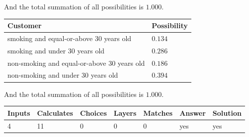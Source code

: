 \documentclass[12pt]{article}
\begin{document}
\noindent
And the total summation of all possibilities is $  %
1.000 $.
 
 
 
 
\noindent{}
 
 

 
 
 
\noindent{}
 
 

 
\noindent
\begin{tabular}{|l|l|}
\hline
Customer & Possibility \\
\hline
smoking  and  %
equal-or-above 30 years old &
  $ %
0.134$ \\
\hline
smoking  and  %
under 30 years old &
  $ %
0.286$ \\
\hline
 non-smoking and  %
equal-or-above 30 years old &
  $ %
0.186$ \\
\hline
 non-smoking and  %
under 30 years old &
  $ %
0.394$ \\
\hline
\end{tabular}
 
\noindent
 And the total summation of all possibilities is $  %
1.000 $.
 
 
 
\noindent{}
 
 

 
\vspace{0.3in}
   
   
   
   
\noindent\begin{tabular}{|l|l|l|l|l|l|l|}
 \hline
Inputs & Calculates & Choices & Layers & Matches & Answer & Solution \\ \hline
           4  & 
          11  & 
           0
  & 
           0  & 
           0  & 
  yes & 
  yes 
  \\ \hline
 \end{tabular}
   
   
   
   
\noindent{}
   
   
  
\end{document}
